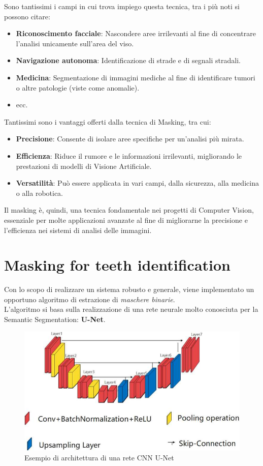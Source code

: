 \documentclass[12pt,a4paper,openright,twoside]{book}
\begin{document}
Sono tantissimi i campi in cui trova impiego questa tecnica, tra i più noti si possono citare:
\begin{itemize}
\item \textbf{Riconoscimento facciale}: Nascondere aree irrilevanti al fine di concentrare l'analisi unicamente sull'area del viso.
\item \textbf{Navigazione autonoma}: Identificazione di strade e di segnali stradali.
\item \textbf{Medicina}: Segmentazione di immagini mediche al fine di identificare tumori o altre patologie (viste come anomalie).
\item ecc.
\end{itemize}
Tantissimi sono i vantaggi offerti dalla tecnica di Masking, tra cui:
\begin{itemize}
\item \textbf{Precisione}: Consente di isolare aree specifiche per un'analisi più mirata.
\item \textbf{Efficienza}: Riduce il rumore e le informazioni irrilevanti, migliorando le prestazioni di modelli di Visione Artificiale.
\item \textbf{Versatilità}: Può essere applicata in vari campi, dalla sicurezza, alla medicina o alla robotica.
\end{itemize}
Il masking è, quindi, una tecnica fondamentale nei progetti di Computer Vision, essenziale per molte applicazioni avanzate al fine di migliorarne la precisione e l'efficienza nei sistemi di analisi delle immagini.\\

\section{Masking for teeth identification}
Con lo scopo di realizzare un sistema robusto e generale, viene implementato un opportuno algoritmo di estrazione di {\itshape maschere binarie}.\\
L'algoritmo si basa sulla realizzazione di una rete neurale molto conosciuta per la Semantic Segmentation: \textbf{U-Net}.
\begin{figure}[H]
  	\centering
   	\includegraphics[width=14cm]{figures/unet.pdf}
    	\caption{Esempio di architettura di una rete CNN U-Net}
	\label{fig:unet}
\end{figure}
\end{document}
